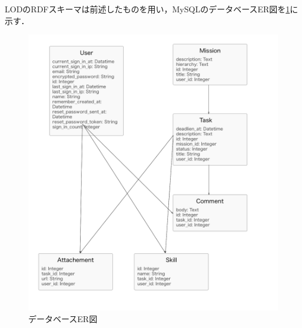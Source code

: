 LODのRDFスキーマは前述したものを用い，MySQLのデータベースER図を\ref{img:system_model}に示す．

\begin{figure}[t]
	\begin{center}
		\includegraphics[width=0.9\linewidth]{assets/img/system_model.png}
		\caption{データベースER図}
		\label{img:system_model}
	\end{center}
\end{figure}
